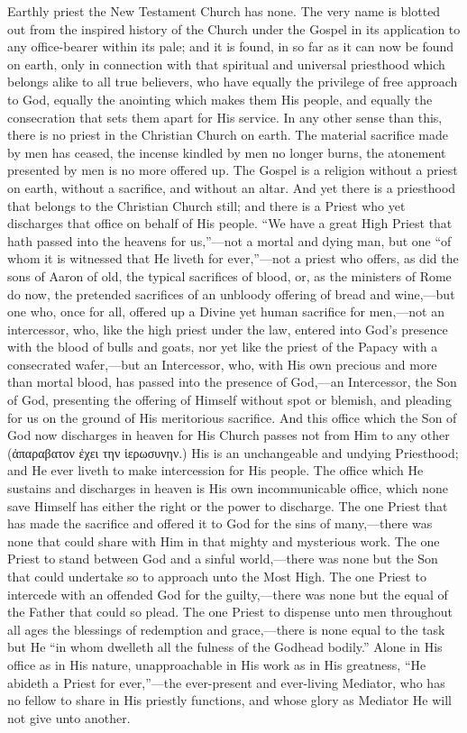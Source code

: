 \documentclass[]{book}
\begin{document}
Earthly priest the New Testament Church has none. The very name is blotted out from the inspired history of the Church under the Gospel in its application to any office-bearer within its pale; and it is found, in so far as it can now be found on earth, only in connection with that spiritual and universal priesthood which belongs alike to all true believers, who have equally the privilege of free approach to God, equally the anointing which makes them His people, and equally the consecration that sets them apart for His service. In any other sense than this, there is no priest in the Christian Church on earth. The material sacrifice made by men has ceased, the incense kindled by men no longer burns, the atonement presented by men is no more offered up. The Gospel is a religion without a priest on earth, without a sacrifice, and without an altar. And yet there is a priesthood that belongs to the Christian Church still; and there is a Priest who yet discharges that office on behalf of His people. ``We have a great High Priest that hath passed into the heavens for us,''---not a mortal and dying man, but one ``of whom it is witnessed that He liveth for ever,''---not a priest who offers, as did the sons of Aaron of old, the typical sacrifices of blood, or, as the ministers of Rome do now, the pretended sacrifices of an unbloody offering of bread and wine,---but one who, once for all, offered up a Divine yet human sacrifice for men,---not an intercessor, who, like the high priest under the law, entered into God's presence with the blood of bulls and goats, nor yet like the priest of the Papacy with a consecrated wafer,---but an Intercessor, who, with His own precious and more than mortal blood, has passed into the presence of God,---an Intercessor, the Son of God, presenting the offering of Himself without spot or blemish, and pleading for us on the ground of His meritorious sacrifice. And this office which the Son of God now discharges in heaven for His Church passes not from Him to any other (ἀπαραβατον ἐχει την ἱερωσυνην.) His is an unchangeable and undying Priesthood; and He ever liveth to make intercession for His people. The office which He sustains and discharges in heaven is His own incommunicable office, which none save Himself has either the right or the power to discharge. The one Priest that has made the sacrifice and offered it to God for the sins of many,---there was none that could share with Him in that mighty and mysterious work. The one Priest to stand between God and a sinful world,---there was none but the Son that could undertake so to approach unto the Most High. The one Priest to intercede with an offended God for the guilty,---there was none but the equal of the Father that could so plead. The one Priest to dispense unto men throughout all ages the blessings of redemption and grace,---there is none equal to the task but He ``in whom dwelleth all the fulness of the Godhead bodily.'' Alone in His office as in His nature, unapproachable in His work as in His greatness, ``He abideth a Priest for ever,''---the ever-present and ever-living Mediator, who has no fellow to share in His priestly functions, and whose glory as Mediator He will not give unto another.
\end{document}
